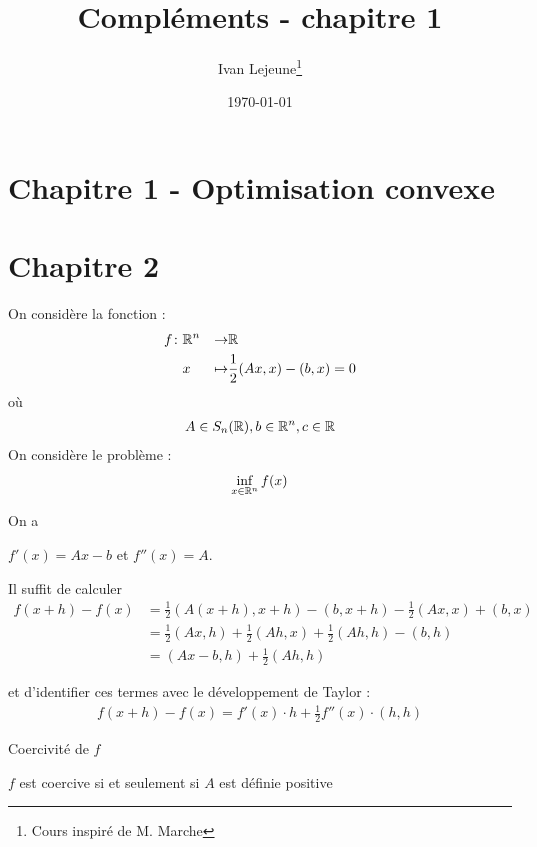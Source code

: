 \documentclass[french,a4paper,10pt]{article}
\title{\color{astral} \sffamily \bfseries Compléments - chapitre 1}
\author{Ivan Lejeune\thanks{Cours inspiré de M. Marche}}
\date{\today}
\begin{document}
	
	\maketitle
	\section{Chapitre 1 - Optimisation convexe}
	\section{Chapitre 2}
	On considère la fonction :
		\[\begin{aligned}
			f\colon &\mathbb{R}^n&\to&\mathbb{R}\\
			&x&\mapsto &\frac 12(Ax,x)-(b,x)=0
		\end{aligned}\]
	où
		\[\begin{aligned}
			A\in S_n(\mathbb{R}),b\in\mathbb{R}^n,c\in\mathbb{R}
		\end{aligned}\]
	On considère le problème :
		\[\begin{aligned}
			\inf_{x\in\mathbb{R}^n}f(x)
		\end{aligned}\]
		
	\begin{oc-proposition}
		On a 
		\begin{center}
			$f'(x)=Ax-b$ et $f''(x)=A$.
		\end{center}
	\end{oc-proposition}
	\begin{myproof}
		Il suffit de calculer
			\[\begin{aligned}
				f(x+h)-f(x)&=\frac12(A(x+h),x+h)-(b,x+h)-\frac12(Ax,x)+(b,x)\\
				&=\frac12(Ax,h)+\frac12(Ah,x)+\frac12(Ah,h)-(b,h)\\
				&=(Ax-b,h)+\frac12(Ah,h)
			\end{aligned}\]
			
		et d'identifier ces termes avec le développement de Taylor :
			\[\begin{aligned}
				f(x+h)-f(x)=f'(x)\cdot h+\frac12 f''(x)\cdot(h,h)
			\end{aligned}\] 
	\end{myproof}
	
	\begin{oc-proposition}
		Coercivité de $f$
		
		$f$ est coercive si et seulement si $A$ est définie positive
	\end{oc-proposition}
	
\end{document}
